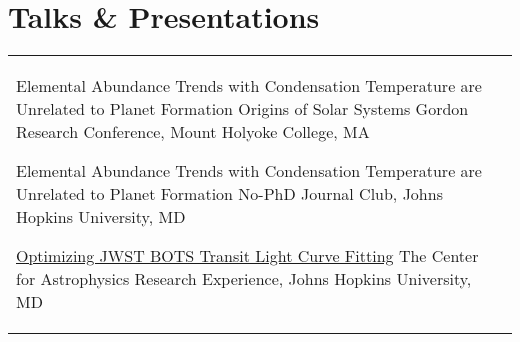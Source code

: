 \documentclass[10pt]{article} %
\begin{document}



\section{Talks \& Presentations}





	
 \begin{supertabular}{L{4cm}@{\hskip 0.3in}L{13cm}}
	{{Elemental Abundance Trends with Condensation Temperature are Unrelated to Planet Formation}}
	{Origins of Solar Systems Gordon Research Conference, Mount Holyoke College, MA}

	{{Elemental Abundance Trends with Condensation Temperature are Unrelated to Planet Formation}}
	{No-PhD Journal Club, Johns Hopkins University, MD}

	{\href{https://sites.krieger.jhu.edu/jhu-care/summer-2022/}{Optimizing JWST BOTS Transit Light Curve Fitting}}
	{The Center for Astrophysics Research Experience, Johns Hopkins University, MD}
\end{supertabular}







	
\end{document}
